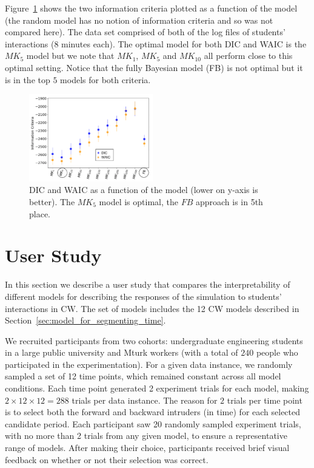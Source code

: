 \documentclass[letterpaper]{article}
\begin{document}
Figure~\ref{fig:dic_waic_scores} shows the two information criteria plotted as a function of the model (the random model has no notion of information criteria and so was not compared here). The data set comprised of both of the log files of students' interactions (8 minutes each). The optimal model for both DIC and WAIC is the $MK_{5}$ model but we note that $MK_{1}$, $MK_{5}$ and $MK_{10}$ all perform close to this optimal setting. Notice that the fully Bayesian model (FB) is not optimal but it is in the top $5$ models for both criteria.
\begin{figure}[t]
\centering
\includegraphics[width=0.48\textwidth]{images/dic_waic_scores.png}
\caption{DIC and WAIC as a function of the model (lower on y-axis is better). The $MK_5$ model is optimal, the $FB$ approach is in 5th place.}
\label{fig:dic_waic_scores}
\end{figure}











\section{User Study}
\label{sec:interpretability_results}



In this section we describe a user study that compares the interpretability of different models for describing the responses of the simulation to students' interactions in CW.
The set of models includes the 12 CW models described in Section~\ref{sec:model_for_segmenting_time}.%









We recruited participants from two cohorts: undergraduate engineering students in a large public university
and Mturk workers (with a total of $240$ people who participated in the experimentation).
For a given data instance, we randomly sampled a set of 12 time points, which  remained constant across all model conditions.
Each time point generated 2 experiment trials for each model, making $2 \times 12 \times 12=288$ trials per data instance. The reason for $2$ trials per time point is to select both the forward and backward intruders (in time) for each selected candidate period. Each participant saw 20 randomly sampled experiment trials, with no more than 2 trials from any given model, to ensure a representative range of models.
After making their choice, participants received brief visual feedback on whether or not their selection was correct.
\end{document}
